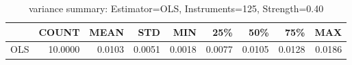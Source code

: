 \begin{table}[ht]
\centering
\caption{variance summary: Estimator=OLS, Instruments=125, Strength=0.40}
\begin{tabular}{lrrrrrrrr}
\toprule
 & COUNT & MEAN & STD & MIN & 25\% & 50\% & 75\% & MAX \\
\midrule
OLS & 10.0000 & 0.0103 & 0.0051 & 0.0018 & 0.0077 & 0.0105 & 0.0128 & 0.0186 \\
\bottomrule
\end{tabular}
\end{table}
